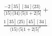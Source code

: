 \documentclass[varwidth, border=5pt]{standalone}
\begin{document}
\begin{my}
$\begin{gathered}
\scriptscriptstyle\frac{-2[35][34]⟨23⟩}{⟨15⟩⟨34⟩⟨5|1+2|5]}+\\
\scriptscriptstyle\frac{1[35]⟨25⟩[45][34]}{⟨15⟩⟨5|1+2|5]^2}\phantom{+}
\end{gathered}$
\end{my}
\end{document}
